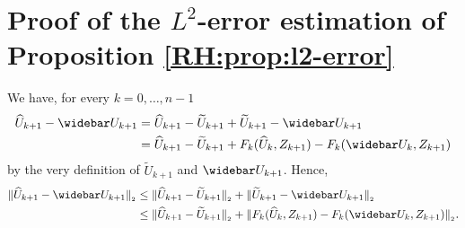 \section{Proof of the $L^2$-error estimation of Proposition \ref{RH:prop:l2-error}} \label{RH:appendix:proofl2error}


We have, for every $k=0, \dots, n-1$
\begin{equation}
	\begin{aligned}
		\widehat U_{k+1} - \widebar U_{k+1}
		 & = \widehat U_{k+1} - \widetilde U_{k+1} + \widetilde U_{k+1} - \widebar U_{k+1}                         \\
		 & = \widehat U_{k+1} - \widetilde U_{k+1} + F_k ( \widehat U_k, Z_{k+1} ) - F_k ( \widebar U_k, Z_{k+1} ) \\
	\end{aligned}
\end{equation}
by the very definition of $\widetilde U_{k+1}$ and $\widebar U_{k+1}$. Hence,
\begin{equation} \label{RH:L2_error_recurquantif_couple}
	\begin{aligned}
		\Vert \widehat U_{k+1} - \widebar U_{k+1} \Vert_{_2}
		 & \leq \Vert \widehat U_{k+1} - \widetilde U_{k+1} \Vert_{_2} + \Vert \widetilde U_{k+1} - \widebar U_{k+1} \Vert_{_2}                    \\
		 & \leq \Vert \widehat U_{k+1} - \widetilde U_{k+1} \Vert_{_2} + \Vert F_k(\widehat U_k, Z_{k+1}) - F_k(\widebar U_k, Z_{k+1}) \Vert_{_2}.
	\end{aligned}
\end{equation}
